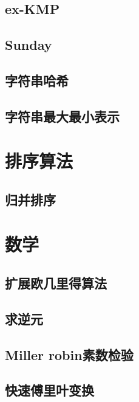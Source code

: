 \documentclass{ctexart}
\begin{document}
\subsection{ex-KMP}

\subsection{Sunday}

\subsection{字符串哈希}

\subsection{字符串最大最小表示}




\section{排序算法}
\subsection{归并排序}




\section{数学}
\subsection{扩展欧几里得算法}

\subsection{求逆元}

\subsection{Miller robin素数检验}

\subsection{快速傅里叶变换}

\end{document}
